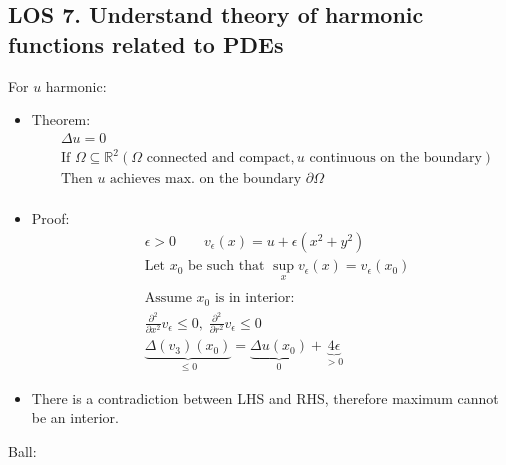 \documentclass[12pt, a4paper]{article}
\begin{document}
\subsection*{LOS 7. Understand theory of harmonic functions related to PDEs}
For $u$ harmonic:
\begin{itemize}
    \item Theorem:
    \begin{align*}
        &\Delta u = 0\\
        &\text{If }\Omega \subseteq \mathbb{R}^2 (\Omega \text{ connected and compact}, u \text{ continuous on the boundary})\\
        &\text{Then $u$ achieves max. on the boundary }\partial\Omega\\
    \end{align*}
    \item Proof:
    \begin{align*}
        &\epsilon > 0\qquad v_\epsilon(x) = u + \epsilon(x^2+y^2)\\
        &\text{Let $x_0$ be such that } \sup_x v_\epsilon(x) = v_\epsilon (x_0)\\\\
        &\text{Assume $x_0$ is in interior: } \\
        &\frac{\partial^2}{\partial x^2}v_\epsilon\leq 0, \;\frac{\partial^2}{\partial r^2}v_\epsilon\leq 0\\
        &\underbrace{\Delta (v_3)(x_0)}_{\leq 0} = \underbrace{\Delta u(x_0)}_0 + \underbrace{4\epsilon}_{>0}
    \end{align*}
    \item There is a contradiction between LHS and RHS, therefore maximum cannot be an interior.\\ 
\end{itemize}
Ball:
\end{document}
